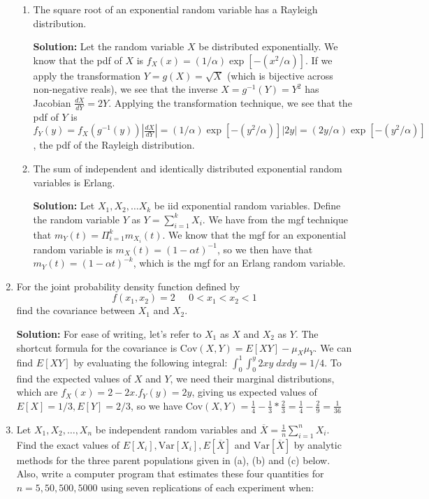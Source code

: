 \documentclass[11pt]{article} %
\newcommand{\tab}{\;\;\;\;\;}
\newcommand{\inv}{^{-1}}
\newcommand{\tr}{\textrm}
\newcommand{\var}{\tr{Var}}
\newcommand{\cov}{\tr{Cov}}
\begin{document}
\begin{enumerate}
\begin{enumerate}
\item The square root of an exponential random variable has a Rayleigh distribution.

{\bf Solution:} Let the random variable $X$ be distributed exponentially.  We know that the pdf of $X$ is $f_X(x) = (1/\alpha)\exp[-(x^2/\alpha)]$.  If we apply the transformation $Y = g(X) = \sqrt{X}$ (which is bijective across non-negative reals), we see that the inverse $X = g\inv(Y) = Y^2$ has Jacobian $\frac{dX}{dY} = 2Y$.  Applying the transformation technique, we see that the pdf of $Y$ is $f_Y(y) = f_X(g\inv(y))|\frac{dX}{dY}| = (1/\alpha)\exp[-(y^2/\alpha)]|2y| = (2y/\alpha)\exp[-(y^2/\alpha)]$, the pdf of the Rayleigh distribution.

\item The sum of independent and identically distributed exponential random variables is Erlang.

{\bf Solution:} Let $X_1, X_2, \ldots X_k$ be iid exponential random variables.  Define the random variable $Y$ as $Y = \sum_{i  = 1}^kX_i$.  We have from the mgf technique that $m_Y(t) = \Pi_{i=1}^km_{X_i}(t)$.  We know that the mgf for an exponential random variable is $m_X(t) = (1 - \alpha t)\inv$, so we then have that $m_Y(t) = (1 - \alpha t)^{-k}$, which is the mgf for an Erlang random variable.  

\end{enumerate}

\newpage

\item For the joint probability density function defined by
$$f(x_1, x_2) = 2 \tab 0 < x_1 < x_2 < 1$$
find the covariance between $X_1$ and $X_2$.

{\bf Solution:} For ease of writing, let's refer to $X_1$ as $X$ and $X_2$ as $Y$.  The shortcut formula for the covariance is $\cov(X,Y) = E[XY] - \mu_X\mu_Y$.  We can find $E[XY]$ by evaluating the following integral: $\int_{0}^{1}\int_{0}^{y}2xy\;dxdy = 1/4$.  To find the expected values of $X$ and $Y$, we need their marginal distributions, which are $f_X(x) = 2 - 2x. f_Y(y) = 2y$, giving us expected values of $E[X] = 1/3, E[Y] = 2/3$, so we have $\cov(X,Y) = \frac{1}{4} - \frac{1}{3}*\frac{2}{3} = \frac{1}{4} - \frac{2}{9} = \frac{1}{36}$

\item Let $X_1, X_2, \ldots, X_n$ be independent random variables and $\overline{X} = \frac{1}{n}\sum_{i = 1}^n X_i$.  Find the exact values of $E[X_i], \var[X_i], E[\overline{X}]$ and $\var[\overline{X}]$ by analytic methods for the three parent populations given in (a), (b) and (c) below.  Also, write a computer program that estimates these four quantities for $n = 5, 50, 500, 5000$ using seven replications of each experiment when:


\end{enumerate}
\end{document}

